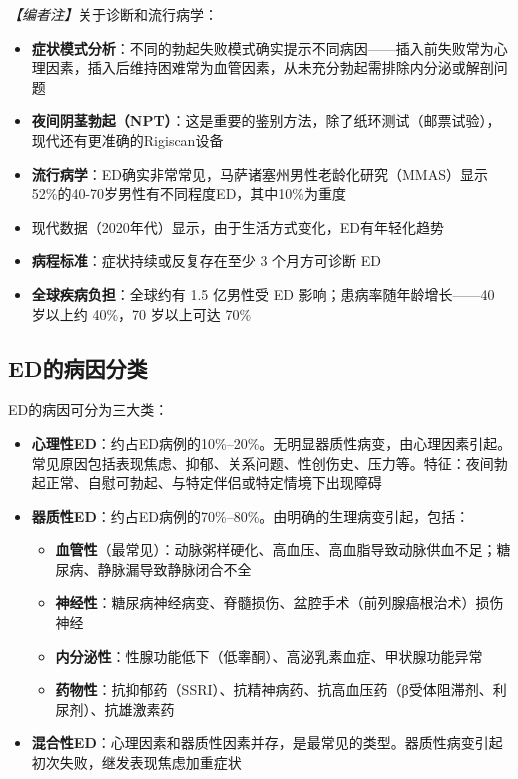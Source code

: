 \documentclass[12pt,a4paper,twoside]{ctexbook}
\begin{document}
\noindent\textit{【编者注】}关于诊断和流行病学：
\begin{itemize}
	\item \textbf{症状模式分析}：不同的勃起失败模式确实提示不同病因——插入前失败常为心理因素，插入后维持困难常为血管因素，从未充分勃起需排除内分泌或解剖问题
	\item \textbf{夜间阴茎勃起（NPT）}：这是重要的鉴别方法，除了纸环测试（邮票试验），现代还有更准确的Rigiscan设备
	\item \textbf{流行病学}：ED确实非常常见，马萨诸塞州男性老龄化研究（MMAS）显示52\%的40-70岁男性有不同程度ED，其中10\%为重度
	\item 现代数据（2020年代）显示，由于生活方式变化，ED有年轻化趋势
	\item \textbf{病程标准}：症状持续或反复存在至少 3 个月方可诊断 ED
	\item \textbf{全球疾病负担}：全球约有 1.5 亿男性受 ED 影响；患病率随年龄增长——40 岁以上约 40\%，70 岁以上可达 70\%
\end{itemize}

\subsection{ED的病因分类}

ED的病因可分为三大类：

\begin{itemize}[leftmargin=2cm]
	\item \textbf{心理性ED}：约占ED病例的10\%--20\%。无明显器质性病变，由心理因素引起。常见原因包括表现焦虑、抑郁、关系问题、性创伤史、压力等。特征：夜间勃起正常、自慰可勃起、与特定伴侣或特定情境下出现障碍
	\item \textbf{器质性ED}：约占ED病例的70\%--80\%。由明确的生理病变引起，包括：
		\begin{itemize}
		\item \textbf{血管性}（最常见）：动脉粥样硬化、高血压、高血脂导致动脉供血不足；糖尿病、静脉漏导致静脉闭合不全
		\item \textbf{神经性}：糖尿病神经病变、脊髓损伤、盆腔手术（前列腺癌根治术）损伤神经
		\item \textbf{内分泌性}：性腺功能低下（低睾酮）、高泌乳素血症、甲状腺功能异常
		\item \textbf{药物性}：抗抑郁药（SSRI）、抗精神病药、抗高血压药（β受体阻滞剂、利尿剂）、抗雄激素药
		\end{itemize}
	\item \textbf{混合性ED}：心理因素和器质性因素并存，是最常见的类型。器质性病变引起初次失败，继发表现焦虑加重症状
\end{itemize}
\end{document}
